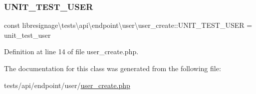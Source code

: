 \subsubsection{\texorpdfstring{U\+N\+I\+T\+\_\+\+T\+E\+S\+T\+\_\+\+U\+S\+ER}{UNIT\_TEST\_USER}}
{\footnotesize\ttfamily const libresignage\textbackslash{}tests\textbackslash{}api\textbackslash{}endpoint\textbackslash{}user\textbackslash{}user\+\_\+create\+::\+U\+N\+I\+T\+\_\+\+T\+E\+S\+T\+\_\+\+U\+S\+ER = \textquotesingle{}unit\+\_\+test\+\_\+user\textquotesingle{}}



Definition at line 14 of file user\+\_\+create.\+php.



The documentation for this class was generated from the following file\+:\begin{DoxyCompactItemize}
\item 
tests/api/endpoint/user/\hyperlink{tests_2api_2endpoint_2user_2user__create_8php}{user\+\_\+create.\+php}\end{DoxyCompactItemize}
